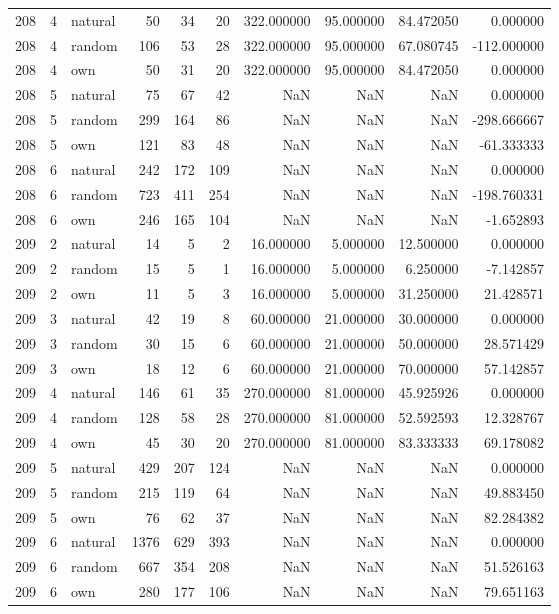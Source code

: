 \begin{table}[htbp]
\begin{tabular}{rrlrrrrrrr}
208 & 4 & natural & 50 & 34 & 20 & 322.000000 & 95.000000 & 84.472050 & 0.000000 \\
208 & 4 & random & 106 & 53 & 28 & 322.000000 & 95.000000 & 67.080745 & -112.000000 \\
208 & 4 & own & 50 & 31 & 20 & 322.000000 & 95.000000 & 84.472050 & 0.000000 \\
208 & 5 & natural & 75 & 67 & 42 & NaN & NaN & NaN & 0.000000 \\
208 & 5 & random & 299 & 164 & 86 & NaN & NaN & NaN & -298.666667 \\
208 & 5 & own & 121 & 83 & 48 & NaN & NaN & NaN & -61.333333 \\
208 & 6 & natural & 242 & 172 & 109 & NaN & NaN & NaN & 0.000000 \\
208 & 6 & random & 723 & 411 & 254 & NaN & NaN & NaN & -198.760331 \\
208 & 6 & own & 246 & 165 & 104 & NaN & NaN & NaN & -1.652893 \\
209 & 2 & natural & 14 & 5 & 2 & 16.000000 & 5.000000 & 12.500000 & 0.000000 \\
209 & 2 & random & 15 & 5 & 1 & 16.000000 & 5.000000 & 6.250000 & -7.142857 \\
209 & 2 & own & 11 & 5 & 3 & 16.000000 & 5.000000 & 31.250000 & 21.428571 \\
209 & 3 & natural & 42 & 19 & 8 & 60.000000 & 21.000000 & 30.000000 & 0.000000 \\
209 & 3 & random & 30 & 15 & 6 & 60.000000 & 21.000000 & 50.000000 & 28.571429 \\
209 & 3 & own & 18 & 12 & 6 & 60.000000 & 21.000000 & 70.000000 & 57.142857 \\
209 & 4 & natural & 146 & 61 & 35 & 270.000000 & 81.000000 & 45.925926 & 0.000000 \\
209 & 4 & random & 128 & 58 & 28 & 270.000000 & 81.000000 & 52.592593 & 12.328767 \\
209 & 4 & own & 45 & 30 & 20 & 270.000000 & 81.000000 & 83.333333 & 69.178082 \\
209 & 5 & natural & 429 & 207 & 124 & NaN & NaN & NaN & 0.000000 \\
209 & 5 & random & 215 & 119 & 64 & NaN & NaN & NaN & 49.883450 \\
209 & 5 & own & 76 & 62 & 37 & NaN & NaN & NaN & 82.284382 \\
209 & 6 & natural & 1376 & 629 & 393 & NaN & NaN & NaN & 0.000000 \\
209 & 6 & random & 667 & 354 & 208 & NaN & NaN & NaN & 51.526163 \\
209 & 6 & own & 280 & 177 & 106 & NaN & NaN & NaN & 79.651163 \\
\bottomrule
\end{tabular}

\end{table}
